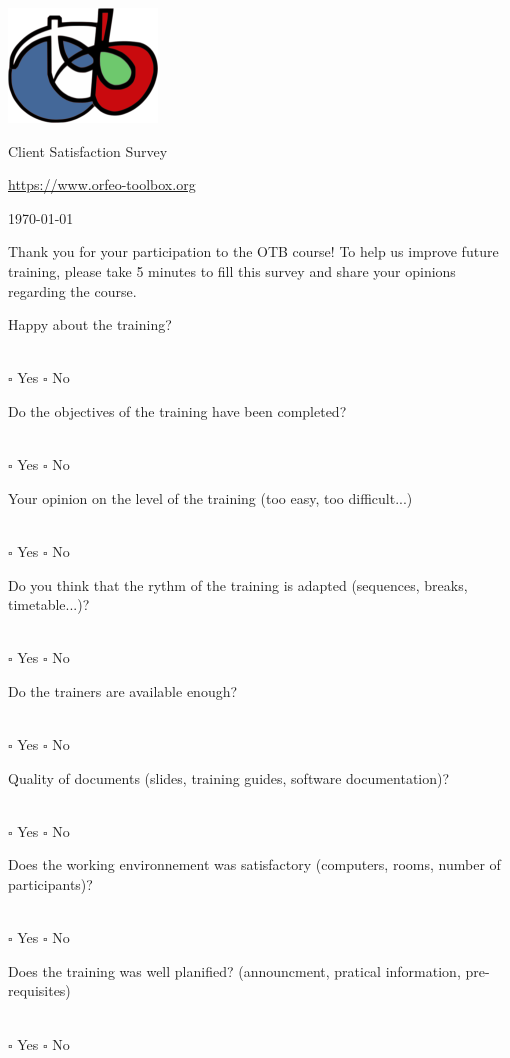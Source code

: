 \documentclass[10pt,a4paper]{article}
\begin{document}
\begin{center}
\includegraphics[scale=0.5]{Art/otb-logo.png}

Client Satisfaction Survey

{\small\url{https://www.orfeo-toolbox.org}}

\today
\end{center}

\begin{center}
\begin{minipage}{.8\textwidth}

Thank you for your participation to the OTB course! To help us improve future
training, please take 5 minutes to fill this survey and share your opinions
regarding the course.
\end{minipage}
\end{center}

\newcommand{\answer}{
\\ \quad $\square$ Yes \quad $\square$ No\\
\vspace{4em}
}

Happy about the training?
\answer

Do the objectives of the training have been completed?
\answer

Your opinion on the level of the training (too easy, too difficult...)
\answer

Do you think that the rythm of the training is adapted (sequences, breaks, timetable...)?
\answer

Do the trainers are available enough?
\answer

Quality of documents (slides, training guides, software documentation)?
\answer

Does the working environnement was satisfactory (computers, rooms, number of participants)?
\answer

Does the training was well planified? (announcment, pratical information, pre-requisites)
\answer

\newcommand{\moduleanswer}{
\\
\begin{tabular}{rlll}  
  Difficulty:         & $\square$ Adapted & $\square$ Difficult & $\square$
  Easy\\
  Timing:       & $\square$ Adapted  & $\square$ Miss time to complete exercises
  & $\square$ Too much time\\
  Support and documentation: & $\square$ Good & $\square$ To improve: & \\
  Comments: &&&\\
\end{tabular}
\vspace{4em}
}
\end{document}
